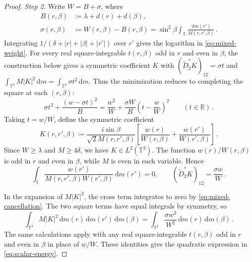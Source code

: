 \documentclass[11pt]{amsart}
\theoremstyle{plain}
\theoremstyle{definition}
\newcommand{\R}{\mathbb R}
\newcommand{\T}{\mathbb T}
\newcommand{\1}{\mathbf 1}
\newcommand{\abs}[1]{\lvert #1\rvert}
\newcommand{\dd}{\,\mathrm d}
\begin{document}
\begin{proof}
		\medskip
		\noindent\emph{Step 2.}
		Write $W=B+\sigma$, where
		\begin{align}
			B(r,\beta)&\coloneqq\lambda+d(r)+d(\beta),\label{eq:B}\\
			\sigma(r,\beta)&\coloneqq W(r,\beta)-B(r,\beta)
			=\sin^2\beta\int_\T\frac{\dd m(r')}{M(r,r',\beta)}\, .\label{eq:sigma}
		\end{align}
		Integrating $1/(\delta+\abs r+\abs\beta+\abs{r'})$ over $r'$ gives
		the logarithm in \eqref{eq:mixed-weight}.
		For every real square-integrable $t(r,\beta)$ odd in $r$ and even in
		$\beta$, the construction below gives a symmetric coefficient $K$ with
		$(\widetilde D_2^*K)_{12}=\sigma t$ and
		$\int_{\T^3}M\abs K^2\dd m=\int_{\T^2}\sigma t^2\dd m$.
		Thus the minimization reduces to completing the square at each
		$(r,\beta)$:
		\begin{equation}\label{eq:scalar-energy}
			\sigma t^2+\frac{(w-\sigma t)^2}{B}
			=\frac{w^2}{W}+\frac{\sigma W}{B}
			\left(t-\frac wW\right)^2
			\qquad(t\in\R)\, .
		\end{equation}
		Taking $t=w/W$, define the symmetric coefficient
		\begin{equation}\label{eq:K}
			K(r,r',\beta)\coloneqq
			\frac{i\sin\beta}{\sqrt2 M(r,r',\beta)}
			\left[\frac{w(r)}{W(r,\beta)}+
			\frac{w(r')}{W(r',\beta)}\right]\, .
		\end{equation}
		Since $W\geq\lambda$ and $M\geq4\delta$, we have $K\in L^2(\T^3)$.
		The function $w(r)/W(r,\beta)$ is odd in $r$ and even in $\beta$, while
		$M$ is even in each variable.  Hence
		\begin{equation}\label{eq:mixed-cancellation}
			\int_\T\frac{w(r')}{M(r,r',\beta)W(r',\beta)}\dd m(r')=0,
			\qquad (\widetilde D_2^*K)_{12}=\frac{\sigma w}{W}\, .
		\end{equation}
		
		In the expansion of $M\abs K^2$, the cross term integrates to zero by
		\eqref{eq:mixed-cancellation}.  The two square terms have equal integrals
		by symmetry, so
		\begin{equation}\label{eq:parity-energy}
			\int_{\T^3}M\abs K^2\dd m(r)\dd m(r')\dd m(\beta)
			=\int_{\T^2}\frac{\sigma w^2}{W^2}\dd m(r)\dd m(\beta)\, .
		\end{equation}
		The same calculations apply with any real square-integrable $t(r,\beta)$
		odd in $r$ and even in $\beta$ in place of $w/W$.
		These identities give the quadratic expression in \eqref{eq:scalar-energy}.
		

\end{proof}
\end{document}
